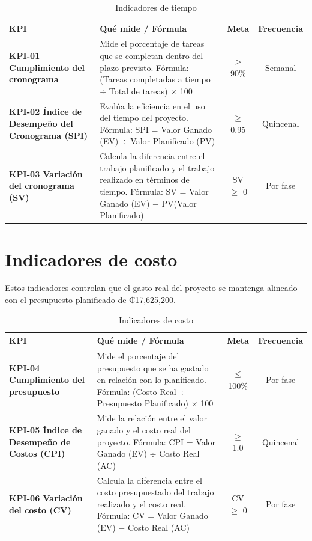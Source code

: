 \documentclass[11pt,spanish]{article}
\begin{document}
\begin{table}[H]
\centering
\small
\caption{Indicadores de tiempo}\label{tab:indicadores-tiempo}
\begin{tabularx}{\textwidth}{p{4.5cm} Y c c}
\toprule
\textbf{KPI} & \textbf{Qué mide / Fórmula} & \textbf{Meta} & \textbf{Frecuencia} \\
\midrule
\textbf{KPI-01 Cumplimiento del cronograma} & Mide el porcentaje de tareas que se completan dentro del plazo previsto. Fórmula: (Tareas completadas a tiempo $\div$ Total de tareas) $\times$ 100 & $\geq$ 90\% & Semanal \\
\textbf{KPI-02 Índice de Desempeño del Cronograma (SPI)} & Evalúa la eficiencia en el uso del tiempo del proyecto. Fórmula: SPI = Valor Ganado (EV) $\div$ Valor Planificado (PV) & $\geq$ 0.95 & Quincenal \\
\textbf{KPI-03 Variación del cronograma (SV)} & Calcula la diferencia entre el trabajo planificado y el trabajo realizado en términos de tiempo. Fórmula: SV = Valor Ganado (EV) $-$ PV(Valor Planificado) & SV $\geq$ 0 & Por fase \\
\bottomrule
\end{tabularx}
\end{table}

\section{Indicadores de costo}

Estos indicadores controlan que el gasto real del proyecto se mantenga alineado con el presupuesto planificado de ₡17,625,200.

\begin{table}[H]
\centering
\small
\caption{Indicadores de costo}\label{tab:indicadores-costo}
\begin{tabularx}{\textwidth}{p{4.5cm} Y c c}
\toprule
\textbf{KPI} & \textbf{Qué mide / Fórmula} & \textbf{Meta} & \textbf{Frecuencia} \\
\midrule
\textbf{KPI-04 Cumplimiento del presupuesto} & Mide el porcentaje del presupuesto que se ha gastado en relación con lo planificado. Fórmula: (Costo Real $\div$ Presupuesto Planificado) $\times$ 100 & $\leq$ 100\% & Por fase \\
\textbf{KPI-05 Índice de Desempeño de Costos (CPI)} & Mide la relación entre el valor ganado y el costo real del proyecto. Fórmula: CPI = Valor Ganado (EV) $\div$ Costo Real (AC) & $\geq$ 1.0 & Quincenal \\
\textbf{KPI-06 Variación del costo (CV)} & Calcula la diferencia entre el costo presupuestado del trabajo realizado y el costo real. Fórmula: CV = Valor Ganado (EV) $-$ Costo Real (AC) & CV $\geq$ 0 & Por fase \\
\bottomrule
\end{tabularx}
\end{table}
\end{document}
